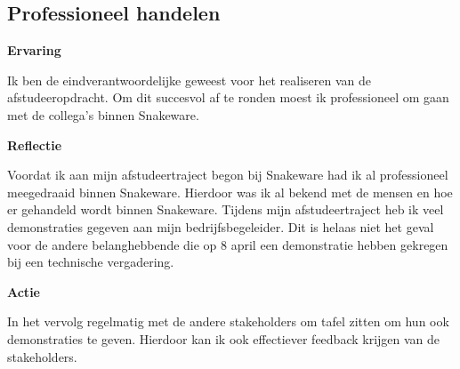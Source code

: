 \subsection{Professioneel handelen}
\textbf{Ervaring}

\whitespace
Ik ben de eindverantwoordelijke geweest voor het realiseren van de afstudeeropdracht.
Om dit succesvol af te ronden moest ik professioneel om gaan met de collega's binnen Snakeware.

\whitespace
\textbf{Reflectie}

\whitespace
Voordat ik aan mijn afstudeertraject begon bij Snakeware had ik al professioneel meegedraaid binnen Snakeware.
Hierdoor was ik al bekend met de mensen en hoe er gehandeld wordt binnen Snakeware.
Tijdens mijn afstudeertraject heb ik veel demonstraties gegeven aan mijn bedrijfsbegeleider.
Dit is helaas niet het geval voor de andere belanghebbende die op 8 april een demonstratie hebben gekregen bij een technische vergadering.

\whitespace
\textbf{Actie}

\whitespace
In het vervolg regelmatig met de andere stakeholders om tafel zitten om hun ook demonstraties te geven.
Hierdoor kan ik ook effectiever feedback krijgen van de stakeholders.
